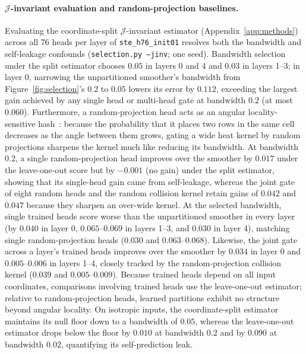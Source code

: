 \paragraph{$\mathcal{J}$-invariant evaluation and random-projection baselines.}
Evaluating the coordinate-split $\mathcal{J}$-invariant estimator
(Appendix~\ref{app:methods}) across all 76 heads per layer of
\texttt{ste\_h76\_init01} resolves both the bandwidth and self-leakage
confounds (\texttt{selection.py --jinv}; one seed). Bandwidth selection
under the split estimator chooses $0.05$ in layers 0 and 4 and $0.03$ in
layers 1--3; in layer 0, narrowing the unpartitioned smoother's bandwidth
from Figure~\ref{fig:selection}'s $0.2$ to $0.05$ lowers its error by
$0.112$, exceeding the largest gain achieved by any single head or
multi-head gate at bandwidth $0.2$ (at most $0.060$). Furthermore, a
random-projection head acts as an angular locality-sensitive
hash~\cite{harpeled2012}: because the probability that it places two rows
in the same cell decreases as the angle between them grows, gating a wide
heat kernel by random projections sharpens the kernel much like reducing
its bandwidth. At bandwidth $0.2$, a single random-projection head improves
over the smoother by $0.017$ under the leave-one-out score but by $-0.001$
(no gain) under the split estimator, showing that its single-head gain came
from self-leakage, whereas the joint gate of eight random heads and the
random collision kernel retain gains of $0.042$ and $0.047$ because they
sharpen an over-wide kernel. At the selected bandwidth, single trained
heads score worse than the unpartitioned smoother in every layer (by
$0.040$ in layer 0, $0.065$--$0.069$ in layers 1--3, and $0.030$ in
layer 4), matching single random-projection heads ($0.030$ and
$0.063$--$0.068$). Likewise, the joint gate across a layer's trained heads
improves over the smoother by $0.034$ in layer 0 and $0.005$--$0.006$ in
layers 1--4, closely tracked by the random-projection collision kernel
($0.039$ and $0.005$--$0.009$). Because trained heads depend on all input
coordinates, comparisons involving trained heads use the leave-one-out
estimator; relative to random-projection heads, learned partitions exhibit
no structure beyond angular locality. On isotropic inputs, the
coordinate-split estimator maintains its null floor down to a bandwidth of
$0.05$, whereas the leave-one-out estimator drops below the floor by
$0.010$ at bandwidth $0.2$ and by $0.090$ at bandwidth $0.02$, quantifying
its self-prediction leak.

